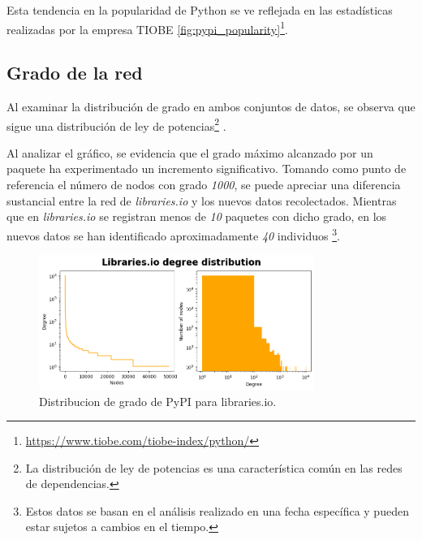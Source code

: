 Esta tendencia en la popularidad de Python se ve reflejada en las estadísticas realizadas por la
empresa TIOBE \ref{fig:pypi_popularity}\footnote{\url{https://www.tiobe.com/tiobe-index/python/}}.


\subsection{Grado de la red}

Al examinar la distribución de grado en ambos conjuntos de datos, se observa que sigue una distribución
de ley de potencias\footnote{La distribución de ley de potencias es una característica común en las redes
    de dependencias.} \cite{enwiki:1160892030}.

Al analizar el gráfico, se evidencia que el grado máximo alcanzado por un paquete ha
experimentado un incremento significativo. Tomando como punto de referencia el número de nodos con grado
\textit{1000}, se puede apreciar una diferencia sustancial entre la red de \textit{libraries.io} y los
nuevos datos recolectados. Mientras que en \textit{libraries.io} se registran menos de \textit{10} paquetes
con dicho grado, en los nuevos datos se han identificado aproximadamente \textit{40} individuos
\footnote{Estos datos se basan en el análisis realizado en una fecha específica y pueden estar sujetos
    a cambios en el tiempo.}.

\begin{figure}[ht!]
    \begin{center}
        \includegraphics[width=0.8\textwidth]{img/pypi/librariesio_degree_distribution.png}
        \caption{Distribucion de grado de PyPI para libraries.io.}
        \label{fig:pypi_librariesio_degree_distribution}
    \end{center}
\end{figure}


